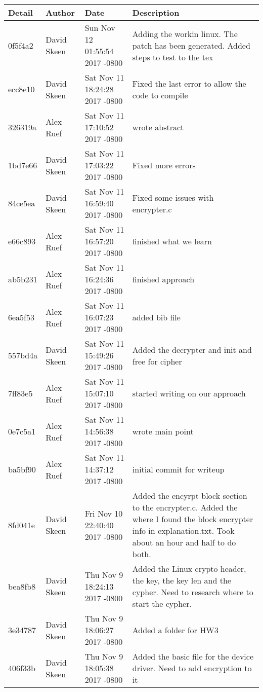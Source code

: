 \documentclass[10pt,drafclsnofoot,onecolumn]{article}
\begin{document}
\begin{tabular}{|p{1.5cm}|p{2cm}|p{5cm}|p{7cm}|}
\textbf{Detail} & \textbf{Author} & \textbf{Date} & \textbf{Description}\\\hline
0f5f4a2 & David Skeen & Sun Nov 12 01:55:54 2017 -0800 & Adding the workin linux. The patch has been generated. Added steps to test to the tex\\\hline
ecc8e10 & David Skeen & Sat Nov 11 18:24:28 2017 -0800 & Fixed the last error to allow the code to compile\\\hline
326319a & Alex Ruef & Sat Nov 11 17:10:52 2017 -0800 & wrote abstract\\\hline
1bd7e66 & David Skeen & Sat Nov 11 17:03:22 2017 -0800 & Fixed more errors\\\hline
84ce5ea & David Skeen & Sat Nov 11 16:59:40 2017 -0800 & Fixed some issues with encrypter.c\\\hline
e66c893 & Alex Ruef & Sat Nov 11 16:57:20 2017 -0800 & finished what we learn\\\hline
ab5b231 & Alex Ruef & Sat Nov 11 16:24:36 2017 -0800 & finished approach\\\hline
6ea5f53 & Alex Ruef & Sat Nov 11 16:07:23 2017 -0800 & added bib file\\\hline
557bd4a & David Skeen & Sat Nov 11 15:49:26 2017 -0800 & Added the decrypter and init and free for cipher\\\hline
7ff83e5 & Alex Ruef & Sat Nov 11 15:07:10 2017 -0800 & started writing on our approach\\\hline
0e7c5a1 & Alex Ruef & Sat Nov 11 14:56:38 2017 -0800 & wrote main point\\\hline
ba5bf90 & Alex Ruef & Sat Nov 11 14:37:12 2017 -0800 & initial commit for writeup\\\hline
8fd041e & David Skeen & Fri Nov 10 22:40:40 2017 -0800 & Added the encyrpt block section to the encrypter.c. Added the where I found the block encrypter info in explanation.txt. Took about an hour and half to do both.\\\hline
bea8fb8 & David Skeen & Thu Nov 9 18:24:13 2017 -0800 & Added the Linux crypto header, the key, the key len and the cypher. Need to research where to start the cypher.\\\hline
3e34787 & David Skeen & Thu Nov 9 18:06:27 2017 -0800 & Added a folder for HW3\\\hline
406f33b & David Skeen & Thu Nov 9 18:05:38 2017 -0800 & Added the basic file for the device driver. Need to add encryption to it\\\hline
\end{tabular}



\end{document}
